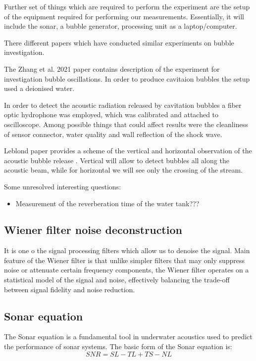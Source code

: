 Further set of things which are required to perform the experiment are the setup of the equipment required for performing our measurements. 
Essentially, it will include the sonar, a bubble generator, processing unit as a laptop/computer.

There different papers which have conducted similar experiments on bubble investigation. 

The Zhang et al. 2021 \cite{zhang_experimental_2021} paper contains description of the experiment for investigation bubble oscillations. In order to produce cavitaion bubbles the setup used a deionised water.

In order to detect the acoustic radiation released by cavitation bubbles a fiber optic hydrophone was employed, which was calibrated and attached to oscilloscope.  
Among possible things that could affect results were the cleanliness of sensor connector, water quality and wall reflection of the shock wave.

Leblond paper provides a scheme of the vertical and horizontal observation of the acoustic bubble release \cite{leblond_acoustic_2014}. Vertical will allow to detect bubbles all along the acoustic beam, while for horizontal we will see only the crossing of the stream.

Some unresolved interesting questions:
\begin{itemize}
    \item Measurement of the reverberation time of the water tank???
\end{itemize}

\subsection{Wiener filter noise deconstruction}

It is one o the signal processing filters which allow us to denoise the signal. Main feature of the Wiener filter is that unlike simpler filters that may only suppress noise or attenuate certain frequency components, the Wiener filter operates on a statistical model of the signal and noise, effectively balancing the trade-off between signal fidelity and noise reduction.


\subsection{Sonar equation }
The Sonar equation is a fundamental tool in underwater acoustics used to predict the performance of sonar systems. 
The basic form of the Sonar equation is:
\begin{equation}
    SNR=SL-TL+TS-NL
\end{equation}

